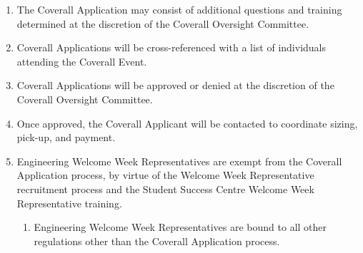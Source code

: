 \begin{enumerate}
\begin{enumerate}
\begin{enumerate}
      \begin{itemize}
       \item
        AODA and Human Rights Code
       \item
        Health and Safety Orientation
       \item
        Violence and Harassment Prevention
      \end{itemize}
     \item
      It Takes All of Us (CONSENT 1A00)
     \item
      Responding to Disclosures on Campus
     \item
      More Feet on the Ground
    \end{enumerate}
  \end{enumerate}
 \item
  The Coverall Application may consist of additional questions and training determined at the discretion of the Coverall Oversight Committee.
 \item
  Coverall Applications will be cross-referenced with a list of individuals attending the Coverall Event.
 \item
  Coverall Applications will be approved or denied at the discretion of the Coverall Oversight Committee.
 \item
  Once approved, the Coverall Applicant will be contacted to coordinate sizing, pick-up, and payment.
 \item
  Engineering Welcome Week Representatives are exempt from the Coverall Application process, by virtue of the Welcome Week Representative recruitment process and the Student Success Centre Welcome Week Representative training.
  \begin{enumerate}
   \item
    Engineering Welcome Week Representatives are bound to all other regulations other than the Coverall Application process.
  \end{enumerate}
\end{enumerate}
